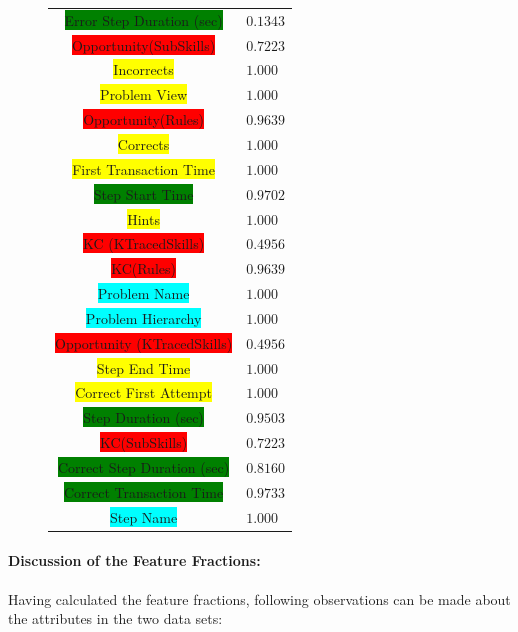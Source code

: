 \begin{figure}[h]
{\begin{tabular}{cl}
				\colorbox{green}{Error Step Duration (sec)}  & $0.1343$ \\
				\colorbox{red}{Opportunity(SubSkills)} & $0.7223$ \\
				\colorbox{yellow}{Incorrects} & $1.000$ \\
				\colorbox{yellow}{Problem View} & $1.000$ \\
				\colorbox{red}{Opportunity(Rules)} & $0.9639$ \\
				\colorbox{yellow}{Corrects} & $1.000$ \\
				\colorbox{yellow}{First Transaction Time} & $1.000$ \\
				\colorbox{green}{Step Start Time} & $0.9702$ \\
				\colorbox{yellow}{Hints} & $1.000$ \\
				\colorbox{red}{KC (KTracedSkills)} & $0.4956$ \\
				\colorbox{red}{KC(Rules)} & $0.9639$ \\
				\colorbox{cyan}{Problem Name} & $1.000$ \\
				\colorbox{cyan}{Problem Hierarchy} & $1.000$ \\
				\colorbox{red}{Opportunity (KTracedSkills)} & $0.4956$ \\
				\colorbox{yellow}{Step End Time} & $1.000$ \\
				\colorbox{yellow}{Correct First Attempt} & $1.000$ \\
				\colorbox{green}{Step Duration (sec)} & $0.9503$ \\
				\colorbox{red}{KC(SubSkills)} & $0.7223$ \\
				\colorbox{green}{Correct Step Duration (sec)} & $0.8160$ \\
				\colorbox{green}{Correct Transaction Time} & $0.9733$ \\
				\colorbox{cyan}{Step Name} & $1.000$\\
				\bottomrule
			\end{tabular}\label{tab_feature_fraction_b}}		
\end{figure}

\paragraph{Discussion of the Feature Fractions:}

Having calculated the feature fractions, following observations can be made about the attributes in the two data sets:

